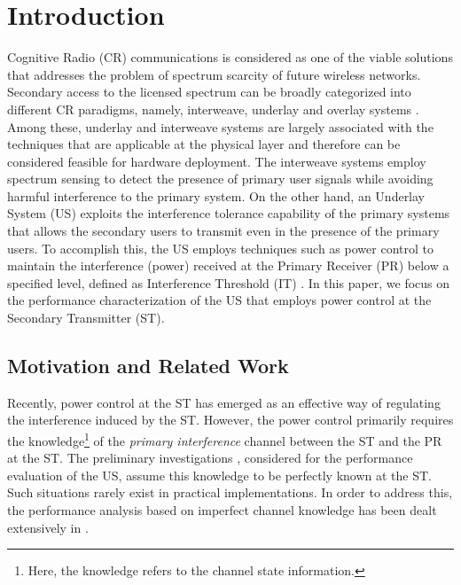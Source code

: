 \section{Introduction}%
Cognitive Radio (CR) communications is considered as one of the viable solutions that addresses the problem of spectrum scarcity of future wireless networks. Secondary access to the licensed spectrum can be broadly categorized into different CR paradigms, namely, interweave, underlay and overlay systems \cite{Goldsmith09}. Among these, underlay and interweave systems are largely associated with the techniques that are applicable at the physical layer and therefore can be considered feasible for hardware deployment. %
The interweave systems employ spectrum sensing to detect the presence of primary user signals while avoiding harmful interference to the primary system. On the other hand, an Underlay System (US) exploits the interference tolerance capability of the primary systems that allows the secondary users to transmit even in the presence of the primary users. To accomplish this, the US employs techniques such as power control to maintain the interference (power) received at the Primary Receiver (PR) below a specified level, defined as Interference Threshold (IT) \cite{Xing07}. In this paper, we focus on the performance characterization of the US that employs power control at the Secondary Transmitter (ST).  

\subsection{Motivation and Related Work}
 Recently, power control at the ST has emerged as an effective way of regulating the interference induced by the ST. However, the power control primarily requires the knowledge\footnote{Here, the knowledge refers to the channel state information.} of the \textit{primary interference} channel between the ST and the PR at the ST. The preliminary investigations \cite{Xing07, Ghasemi07, Sura08, Musa09_, Kang09}, considered for the performance evaluation of the US, assume this knowledge to be perfectly known at the ST. Such situations rarely exist in practical implementations. In order to address this, the performance analysis based on imperfect channel knowledge has been dealt extensively in \cite{Musa09, Suraweera10, Kim12, Alou12, Stat12, Alou13, Zhang13, Smith13, Li13, Kerr14, Sharma15}. 

